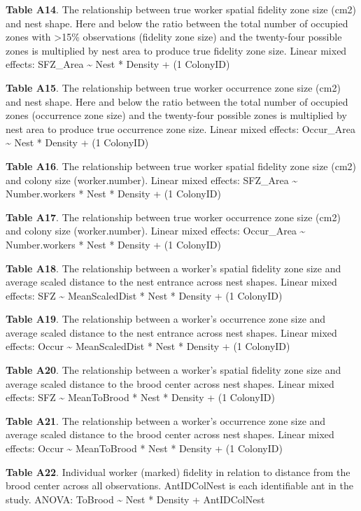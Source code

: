 \documentclass[3p]{elsarticle} %
\begin{document}
\textbf{Table A14}. The relationship between true worker spatial
fidelity zone size (cm2) and nest shape. Here and below the ratio
between the total number of occupied zones with \textgreater15\%
observations (fidelity zone size) and the twenty-four possible zones is
multiplied by nest area to produce true fidelity zone size. Linear mixed
effects: SFZ\_Area \textasciitilde{} Nest * Density + (1 \textbar{}
ColonyID)

\textbf{Table A15}. The relationship between true worker occurrence zone
size (cm2) and nest shape. Here and below the ratio between the total
number of occupied zones (occurrence zone size) and the twenty-four
possible zones is multiplied by nest area to produce true occurrence
zone size. Linear mixed effects: Occur\_Area \textasciitilde{} Nest *
Density + (1 \textbar{} ColonyID)

\textbf{Table A16}. The relationship between true worker spatial
fidelity zone size (cm2) and colony size (worker.number). Linear mixed
effects: SFZ\_Area \textasciitilde{} Number.workers * Nest * Density +
(1 \textbar{} ColonyID)

\textbf{Table A17}. The relationship between true worker occurrence zone
size (cm2) and colony size (worker.number). Linear mixed effects:
Occur\_Area \textasciitilde{} Number.workers * Nest * Density + (1
\textbar{} ColonyID)

\textbf{Table A18}. The relationship between a worker's spatial fidelity
zone size and average scaled distance to the nest entrance across nest
shapes. Linear mixed effects: SFZ \textasciitilde{} MeanScaledDist *
Nest * Density + (1 \textbar{} ColonyID)

\textbf{Table A19}. The relationship between a worker's occurrence zone
size and average scaled distance to the nest entrance across nest
shapes. Linear mixed effects: Occur \textasciitilde{} MeanScaledDist *
Nest * Density + (1 \textbar{} ColonyID)

\textbf{Table A20}. The relationship between a worker's spatial fidelity
zone size and average scaled distance to the brood center across nest
shapes. Linear mixed effects: SFZ \textasciitilde{} MeanToBrood * Nest *
Density + (1 \textbar{} ColonyID)

\textbf{Table A21}. The relationship between a worker's occurrence zone
size and average scaled distance to the brood center across nest shapes.
Linear mixed effects: Occur \textasciitilde{} MeanToBrood * Nest *
Density + (1 \textbar{} ColonyID)

\textbf{Table A22}. Individual worker (marked) fidelity in relation to
distance from the brood center across all observations. AntIDColNest is
each identifiable ant in the study. ANOVA: ToBrood \textasciitilde{}
Nest * Density + AntIDColNest
\end{document}
